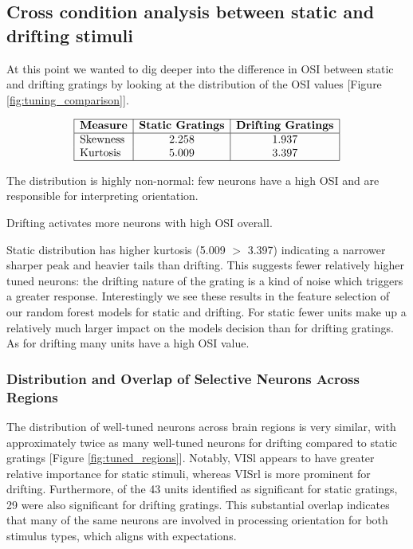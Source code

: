 \documentclass[10pt,twocolumn]{article}
\begin{document}
\subsection{Cross condition analysis between static and drifting stimuli}

At this point we wanted to dig deeper into the difference in OSI between static and drifting gratings by looking at the distribution of the OSI values [Figure \ref{fig:tuning_comparison}]. 

\[
\begin{array}{|l|c|c|}
\hline
\textbf{Measure} & \textbf{Static Gratings} & \textbf{Drifting Gratings} \\
\hline
\text{Skewness} & 2.258 & 1.937 \\
\text{Kurtosis} & 5.009 & 3.397 \\
\hline
\end{array}
\]

The distribution is highly non-normal: few neurons have a high OSI and are responsible for interpreting orientation.

Drifting activates more neurons with high OSI overall.

Static distribution has higher kurtosis (5.009 $>$ 3.397) indicating a narrower sharper peak and heavier tails than drifting. This suggests fewer relatively higher tuned neurons: the drifting nature of the grating is a kind of noise which triggers a greater response. Interestingly we see these results in the feature selection of our random forest models for static and drifting. For static fewer units make up a relatively much larger impact on the models decision than for drifting gratings. As for drifting many units have a high OSI value. 

\subsubsection{Distribution and Overlap of Selective Neurons Across Regions}

The distribution of well-tuned neurons across brain regions is very similar, with approximately twice as many well-tuned neurons for drifting compared to static gratings [Figure \ref{fig:tuned_regions}]. Notably, VISl appears to have greater relative importance for static stimuli, whereas VISrl is more prominent for drifting. Furthermore, of the 43 units identified as significant for static gratings, 29 were also significant for drifting gratings. This substantial overlap indicates that many of the same neurons are involved in processing orientation for both stimulus types, which aligns with expectations.
\end{document}
